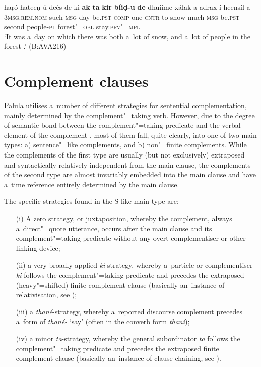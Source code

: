 \begin{exe}
\ex
\label{ex:13-126}
\gll haṛó hateeṇ-ú deés de ki \textbf{ak} \textbf{ta} \textbf{kir} \textbf{bíiḍ-u} \textbf{de} dhuíime xálak-a  adrax-í heensíl-a \\
\textsc{3msg.rem.nom} such-\textsc{msg}  day be.\textsc{pst} \textsc{comp} one \textsc{cntr} to snow much-\textsc{msg} be.\textsc{pst} second people-\textsc{pl}  forest"=\textsc{obl} stay.\textsc{pfv"=mpl} \\
\glt `It was a~day on which there was both a~lot of snow, and a~lot of people in the forest .' (B:AVA216)
\end{exe}

\section{Complement clauses}
\label{sec:13-5}

Palula utilises a~number of different strategies for sentential complementation, mainly determined by the complement"=taking verb. However, due to the degree of semantic bond between the complement"=taking predicate and the verbal element of the complement \citep[39-40]{givon2001b}, most of them fall, quite clearly, into one of two main types: a) sentence"=like complements, and b) non"=finite complements. While the complements of the first type are usually (but not exclusively) extraposed and syntactically relatively independent from the main clause, the complements of the second type are almost invariably embedded into the main clause and have a~time reference entirely determined by the main clause.

The specific strategies found in the S-like main type are:

\begin{enumerate}
\item[(i)] A zero strategy, or juxtaposition, whereby the complement, always a~direct"=quote utterance, occurs after the main clause and its complement"=taking predicate without any overt complementiser or other linking device;
\item[(ii)] a very broadly applied \textit{ki}-strategy, whereby a~particle or complementiser \textit{ki} follows the complement"=taking predicate and precedes the extraposed (heavy"=shifted) finite complement clause (basically an~instance of relativisation, see );
\item[(iii)] a \textit{thané}-strategy, whereby a~reported discourse complement precedes a~form of \textit{thané-} `say' (often in the converb form \textit{thaní});
\item[(iv)] a minor \textit{ta}-strategy, whereby the general subordinator \textit{ta} follows the complement"=taking predicate and precedes the extraposed finite complement clause (basically an~instance of clause chaining, see ).
\end{enumerate}

